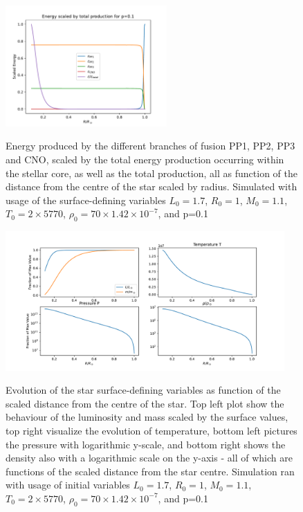 \documentclass[10pt, nofootinbib, twocolumn]{revtex4-1}
\begin{document}
\begin{figure}[H]
    \caption{Energy produced by the different branches of fusion PP1, PP2, PP3 and CNO, scaled by the total energy production occurring within the stellar core, as well as the total production, all as function of the distance from the centre of the star scaled by radius. Simulated with usage of the surface-defining variables $L_0=1.7$, $R_0=1$, $M_0=1.1$, $T_0=2\times5770$, $\rho_0=70\times1.42\times 10^{-7}$, and p=0.1}
    \centering
    \includegraphics[width = 0.55\textwidth]{Figures/EnergyProductionfinal.pdf} 
    \label{fig:energy}
\end{figure} 

\begin{figure}
    \caption{Evolution of the star surface-defining variables as function of the scaled distance from the centre of the star. Top left plot show the behaviour of the luminosity and mass scaled by the surface values, top right visualize the evolution of temperature, bottom left pictures the pressure with logarithmic y-scale, and bottom right shows the density also with a logarithmic scale on the y-axis - all of which are functions of the scaled distance from the star centre. Simulation ran with usage of initial variables $L_0=1.7$, $R_0=1$, $M_0=1.1$, $T_0=2\times5770$, $\rho_0=70\times1.42\times 10^{-7}$, and p=0.1}
    \centering
    \includegraphics[width = 0.95\textwidth]{Figures/VariablesSpecialfinal.pdf} 
    \label{fig:variables}
\end{figure} 
\end{document}
